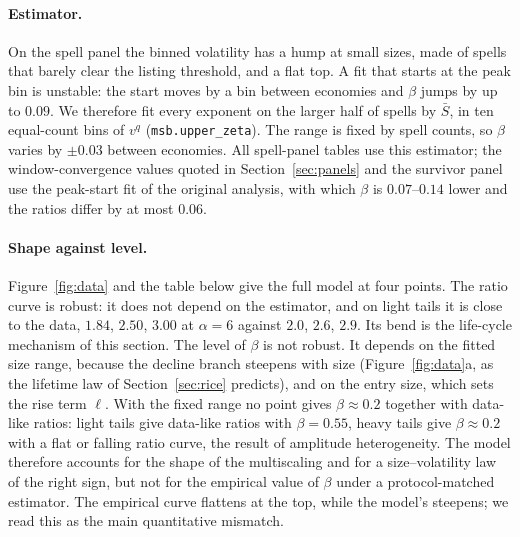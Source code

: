 \documentclass[11pt]{article}
\begin{document}
\paragraph{Estimator.}  On the spell panel the binned volatility has a hump at small sizes, made of
spells that barely clear the listing threshold, and a flat top.  A fit that starts at the peak
bin is unstable: the start moves by a bin between economies and $\beta$ jumps by up to $0.09$.  We
therefore fit every exponent on the larger half of spells by $\bar S$, in ten equal-count bins of
$v^q$ (\texttt{msb.upper\_zeta}).  The range is fixed by spell counts, so $\beta$ varies by $\pm0.03$
between economies.  All spell-panel tables use this estimator; the window-convergence
values quoted in Section~\ref{sec:panels} and the survivor panel use the peak-start fit of the
original analysis, with which $\beta$ is $0.07$--$0.14$ lower and the ratios differ by at most $0.06$.

\paragraph{Shape against level.}  Figure~\ref{fig:data} and the table below give the full model at
four points.  The ratio curve is robust: it does not depend on the estimator, and on light tails
it is close to the data, $1.84$, $2.50$, $3.00$ at $\alpha=6$ against $2.0$, $2.6$, $2.9$.  Its bend is
the life-cycle mechanism of this section.  The level of $\beta$ is not robust.  It depends on the
fitted size range, because the decline branch steepens with size (Figure~\ref{fig:data}a, as the
lifetime law of Section~\ref{sec:rice} predicts), and on the entry size, which sets the rise term
$\ell$.  With the fixed range no point gives $\beta\approx0.2$ together with data-like ratios: light
tails give data-like ratios with $\beta=0.55$, heavy tails give $\beta\approx0.2$ with a flat or falling
ratio curve, the result of amplitude heterogeneity.  The model therefore accounts for the shape of
the multiscaling and for a size--volatility law of the right sign, but not for the empirical
value of $\beta$ under a protocol-matched estimator.  The empirical curve flattens at the top,
while the model's steepens; we read this as the main quantitative mismatch.
\end{document}
